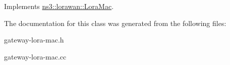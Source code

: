 Implements \hyperlink{classns3_1_1lorawan_1_1LoraMac_aa64037192af83dc459487bccccd10bdf}{ns3\+::lorawan\+::\+Lora\+Mac}.



The documentation for this class was generated from the following files\+:\begin{DoxyCompactItemize}
\item 
gateway-\/lora-\/mac.\+h\item 
gateway-\/lora-\/mac.\+cc\end{DoxyCompactItemize}
